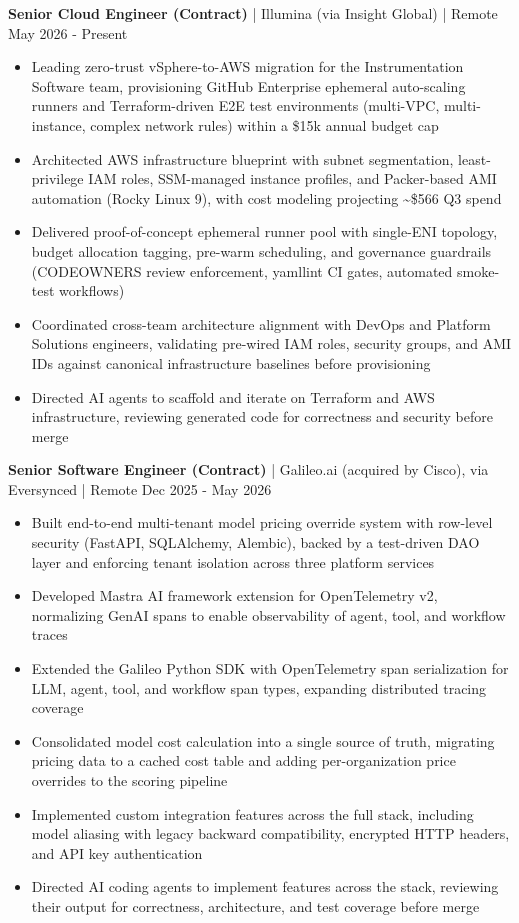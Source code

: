 \documentclass[11pt,letterpaper]{article}
\newcommand{\job}[4]{%
  \vspace{4pt}\textbf{#1} | #2 | #3 \hfill #4\par}
\newenvironment{bullets}
  {\begin{itemize}\setlength{\itemsep}{1pt}\setlength{\parskip}{0pt}\setlength{\topsep}{2pt}}
  {\end{itemize}}
\begin{document}
\job{Senior Cloud Engineer (Contract)}{Illumina (via Insight Global)}{Remote}{May 2026 - Present}
\begin{bullets}
\item Leading zero-trust vSphere-to-AWS migration for the Instrumentation Software team, provisioning GitHub Enterprise ephemeral auto-scaling runners and Terraform-driven E2E test environments (multi-VPC, multi-instance, complex network rules) within a \$15k annual budget cap
\item Architected AWS infrastructure blueprint with subnet segmentation, least-privilege IAM roles, SSM-managed instance profiles, and Packer-based AMI automation (Rocky Linux 9), with cost modeling projecting \textasciitilde\$566 Q3 spend
\item Delivered proof-of-concept ephemeral runner pool with single-ENI topology, budget allocation tagging, pre-warm scheduling, and governance guardrails (CODEOWNERS review enforcement, yamllint CI gates, automated smoke-test workflows)
\item Coordinated cross-team architecture alignment with DevOps and Platform Solutions engineers, validating pre-wired IAM roles, security groups, and AMI IDs against canonical infrastructure baselines before provisioning
\item Directed AI agents to scaffold and iterate on Terraform and AWS infrastructure, reviewing generated code for correctness and security before merge
\end{bullets}

\job{Senior Software Engineer (Contract)}{Galileo.ai (acquired by Cisco), via Eversynced}{Remote}{Dec 2025 - May 2026}
\begin{bullets}
\item Built end-to-end multi-tenant model pricing override system with row-level security (FastAPI, SQLAlchemy, Alembic), backed by a test-driven DAO layer and enforcing tenant isolation across three platform services
\item Developed Mastra AI framework extension for OpenTelemetry v2, normalizing GenAI spans to enable observability of agent, tool, and workflow traces
\item Extended the Galileo Python SDK with OpenTelemetry span serialization for LLM, agent, tool, and workflow span types, expanding distributed tracing coverage
\item Consolidated model cost calculation into a single source of truth, migrating pricing data to a cached cost table and adding per-organization price overrides to the scoring pipeline
\item Implemented custom integration features across the full stack, including model aliasing with legacy backward compatibility, encrypted HTTP headers, and API key authentication
\item Directed AI coding agents to implement features across the stack, reviewing their output for correctness, architecture, and test coverage before merge
\end{bullets}
\end{document}
